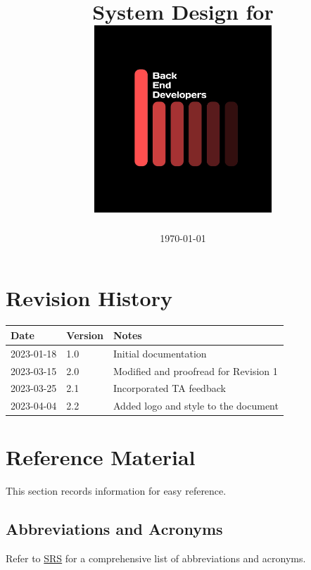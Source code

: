 \documentclass[12pt, titlepage]{article}
\begin{document}
\title{\textbf{System Design for \progname{}} \\ \vspace{2cm} \includegraphics[width=0.5\textwidth]{../../logo.jpg}}
 \pagecolor{black}\afterpage{\nopagecolor}
\author{\authname}
\date{\today}

\color{white}\maketitle
\color{black}

\section{Revision History}

\begin{tabularx}{\textwidth}{p{4cm}p{2cm}X}
\toprule {\bf Date} & {\bf Version} & {\bf Notes}\\
\midrule
2023-01-18 & 1.0 & Initial documentation\\
2023-03-15 & 2.0 & Modified and proofread for Revision 1 \\
2023-03-25 & 2.1 & Incorporated TA feedback \\
2023-04-04 & 2.2 & Added logo and style to the document \\
\bottomrule
\end{tabularx}

\newpage

\section{Reference Material}

This section records information for easy reference.

\subsection{Abbreviations and Acronyms}
Refer to \href{https://github.com/zakerl/Capstone_Project/blob/main/docs/SRS/SRS.pdf}{SRS} for a comprehensive list of abbreviations and acronyms.\\
\end{document}
